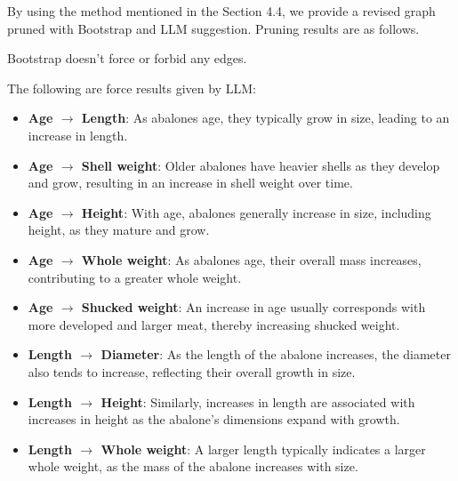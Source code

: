 \documentclass{article}
\begin{document}
\begin{minipage}[t]{0.6\linewidth}
    
        By using the method mentioned in the Section 4.4, we provide a revised graph pruned with Bootstrap and LLM suggestion.
        Pruning results are as follows.
        
        Bootstrap doesn't force or forbid any edges.
            
        The following are force results given by LLM:
            
        \begin{itemize}
            
            \item \textbf{Age $\rightarrow$ Length}: As abalones age, they typically grow in size, leading to an increase in length.
                
            \item \textbf{Age $\rightarrow$ Shell weight}: Older abalones have heavier shells as they develop and grow, resulting in an increase in shell weight over time.
                
            \item \textbf{Age $\rightarrow$ Height}: With age, abalones generally increase in size, including height, as they mature and grow.
                
            \item \textbf{Age $\rightarrow$ Whole weight}: As abalones age, their overall mass increases, contributing to a greater whole weight.
                
            \item \textbf{Age $\rightarrow$ Shucked weight}: An increase in age usually corresponds with more developed and larger meat, thereby increasing shucked weight.
                
            \item \textbf{Length $\rightarrow$ Diameter}: As the length of the abalone increases, the diameter also tends to increase, reflecting their overall growth in size.
                
            \item \textbf{Length $\rightarrow$ Height}: Similarly, increases in length are associated with increases in height as the abalone's dimensions expand with growth.
                
            \item \textbf{Length $\rightarrow$ Whole weight}: A larger length typically indicates a larger whole weight, as the mass of the abalone increases with size.
                

\end{itemize}
\end{minipage}
\end{document}
